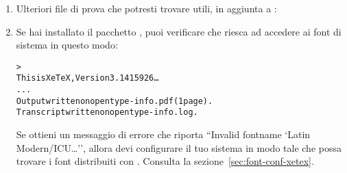 \documentclass{article}
\begin{document}
\begin{enumerate}
\item Ulteriori file di prova che potresti trovare utili, in aggiunta a
:


\item Se hai installato il pacchetto , puoi verificare che
riesca ad accedere ai font di sistema in questo modo:
\begin{alltt}
> 
This is XeTeX, Version 3.1415926\dots
...
Output written on opentype-info.pdf (1 page).
Transcript written on opentype-info.log.
\end{alltt}
Se ottieni un messaggio di errore che riporta ``Invalid fontname `Latin
Modern/ICU\dots'', allora devi configurare il tuo sistema in modo tale che
\XeTeX{} possa trovare i font distribuiti con \TL. Consulta la
sezione~\ref{sec:font-conf-xetex}.

\end{enumerate}
\end{document}
